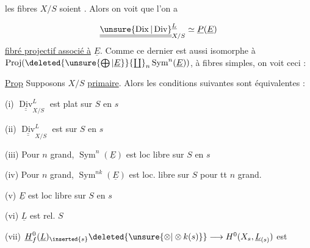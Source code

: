les fibres  $X/S$ soient  . Alors on voit que l'on a

\[
\underline{\underline{\unsure{\operatorname{Dix}|\operatorname{Div}}}}_{X/S}^{\underline L}\simeq\underline P(\underline E)
\]
\uline{fibré projectif associé à} $\underline E$. Comme ce dernier est aussi isomorphe à $\operatorname{Proj}(\deleted{\unsure{\bigoplus|\underline E}}{\textstyle\coprod}_n\operatorname{Sym}^{n}(\underline E))$,  à fibres simples, on voit ceci :

\uline{Prop} Supposons $X/S$ \uline{primaire}. Alors  les conditions suivantes sont équivalentes :

(i) $\underline{\underline{\operatorname{Div}}}_{X/S}^{L}$ est plat sur $S$ en $s$

(ii) $\underline{\underline{\operatorname{Div}}}_{X/S}^{L}$ est  sur $S$ en $s$

(iii) Pour $n$ grand, $\operatorname{Sym}^{n}(\underline E)$ est loc libre sur $S$ en $s$

(iv) Pour  $n$ grand, $\operatorname{Sym}^{nk}(\underline E)$ est loc. libre sur $S$  pour tt $n$ grand.

(v) $\underline E$ est  loc libre sur $S$ en $s$

(vi) $\underline L$ est  rel. $S$

(vii) $\underline H_f^0(\underline L)_{\inserted{s}}\deleted{\unsure{\otimes|\otimes k(s)}}\longrightarrow H^0(X_s,\underline L_{(s)})$ est 
